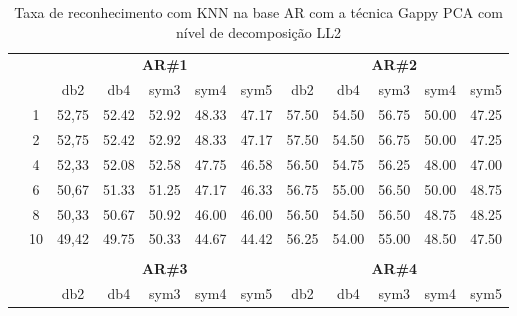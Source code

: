 \begin{table}[htpb]
	\centering
    \normalsize
	\caption{Taxa de reconhecimento com KNN na base AR com a técnica Gappy PCA com nível de decomposição LL2}
	\begin{tabular}{|c|c|c c c c c|c c c c c|}
\cline{3-12}
\multicolumn{2}{c|}{\multirow{2}{*}{}} & \multicolumn{5}{c|}{\textbf{AR\#1}}  & \multicolumn{5}{c|}{\textbf{AR\#2}} \\\cline{3-12}

\multicolumn{2}{c|}{}  & db2 & db4 & sym3 & sym4 & sym5 & db2 & db4& sym3 & sym4 & sym5 \\\hline

\multicolumn{1}{|c|}{ \multirow{5}{*}{\rotatebox[origin=c]{90}{\textbf{K-vizinhos}}} }
&1&52,75	&52.42	&52.92	&48.33	&47.17	&57.50	&54.50	&56.75	&50.00	&47.25\\\cline{2-12}
&2&52,75	&52.42	&52.92	&48.33	&47.17	&57.50	&54.50	&56.75	&50.00	&47.25\\\cline{2-12}
&4&52,33	&52.08	&52.58	&47.75	&46.58	&56.50	&54.75	&56.25	&48.00	&47.00\\\cline{2-12}
&6&50,67	&51.33	&51.25	&47.17	&46.33	&56.75	&55.00	&56.50	&50.00	&48.75\\\cline{2-12}
&8&50,33	&50.67	&50.92	&46.00	&46.00	&56.50	&54.50	&56.50	&48.75	&48.25\\\cline{2-12}
&10&49,42	&49.75	&50.33	&44.67	&44.42	&56.25	&54.00	&55.00	&48.50	&47.50%

\\ \midrule
\multicolumn{12}{c}{}\\ 




\cline{3-12}
\multicolumn{2}{c}{} & \multicolumn{5}{|c|}{\textbf{AR\#3}}  & \multicolumn{5}{c|}{\textbf{AR\#4}} \\\cline{3-12}
\multicolumn{2}{c}{}  & \multicolumn{1}{|c}{db2} & db4 & sym3 & sym4 & sym5 & db2 & db4& sym3 & sym4 & sym5 \\\hline


\end{tabular}
\end{table}
